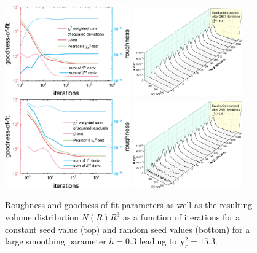 \begin{figure}[htb]
\centering
\includegraphics[width=0.48\textwidth]{../images/form_factor/EM/EMconstant_seed_smooth_0_3_goodness_of_fit.png}
\hspace{0.06\textwidth}
\includegraphics[width=0.42\textwidth]{../images/form_factor/EM/EMconstant_seed_smooth_0_3_NR.png}
\includegraphics[width=0.48\textwidth]{../images/form_factor/EM/EMrandom_seed_smooth_0_3_goodness_of_fit.png}
\hspace{0.06\textwidth}
\includegraphics[width=0.42\textwidth]{../images/form_factor/EM/EMrandom_seed_smooth_0_3_NR.png}
\caption{Roughness and goodness-of-fit parameters as well as the resulting volume distribution $N(R)R^3$ as a function of iterations for  a constant seed value (top) and random seed values (bottom) for a large smoothing parameter $h=0.3$ leading to $\chi_r^2=15.3$.\label{fig:EMhlarge}}
\end{figure}

